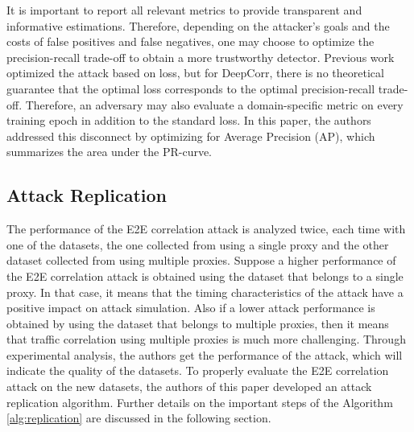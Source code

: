 \documentclass[sigconf]{acmart}
\begin{document}
It is important to report all relevant metrics to provide transparent and informative estimations. Therefore, depending on the attacker's goals and the costs of false positives and false negatives, one may choose to optimize the precision-recall trade-off to obtain a more trustworthy detector. Previous work optimized the attack based on loss, but for DeepCorr, there is no theoretical guarantee that the optimal loss corresponds to the optimal precision-recall trade-off. Therefore, an adversary may also evaluate a domain-specific metric on every training epoch in addition to the standard loss. In this paper, the authors addressed this disconnect by optimizing for Average Precision (AP), which summarizes the area under the PR-curve.



\subsection{Attack Replication} \label{6.2}

The performance of the E2E correlation attack is analyzed twice, each time with one of the datasets, the one collected from using a single proxy and the other dataset collected from using multiple proxies. Suppose a higher performance of the E2E correlation attack is obtained using the dataset that belongs to a single proxy. In that case, it means that the timing characteristics of the attack have a positive impact on attack simulation. Also if a lower attack performance is obtained by using the dataset that belongs to multiple proxies, then it means that traffic correlation using multiple proxies is much more challenging. Through experimental analysis, the authors get the performance of the attack, which will indicate the quality of the datasets. To properly evaluate the E2E correlation attack on the new datasets, the authors of this paper developed an attack replication algorithm. Further details on the important steps of the Algorithm \ref{alg:replication} are discussed in the following section.

\vspace{4mm}
\end{document}
